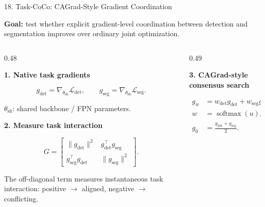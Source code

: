 \documentclass[aspectratio=169,11pt]{beamer}
\begin{document}
\begin{frame}{18. Task-CoCo: CAGrad-Style Gradient Coordination}

\scriptsize
\setlength{\abovedisplayskip}{3pt}
\setlength{\belowdisplayskip}{3pt}
\setlength{\abovedisplayshortskip}{2pt}
\setlength{\belowdisplayshortskip}{2pt}

\textbf{Goal:}
test whether explicit gradient-level coordination between detection and
segmentation improves over ordinary joint optimization.

\vspace{0.08cm}

\begin{columns}[T,onlytextwidth]

\begin{column}{0.48\textwidth}

\textbf{1. Native task gradients}

\[
g_{\mathrm{det}}
=
\nabla_{\theta_{\mathrm{sh}}}
\mathcal{L}_{\mathrm{det}},
\qquad
g_{\mathrm{seg}}
=
\nabla_{\theta_{\mathrm{sh}}}
\mathcal{L}_{\mathrm{seg}}.
\]

{\tiny
$\theta_{\mathrm{sh}}$: shared backbone / FPN parameters.
}

\vspace{0.08cm}

\textbf{2. Measure task interaction}

\[
G=
\begin{bmatrix}
\|g_{\mathrm{det}}\|^2
&
g_{\mathrm{det}}^\top g_{\mathrm{seg}}
\\
g_{\mathrm{seg}}^\top g_{\mathrm{det}}
&
\|g_{\mathrm{seg}}\|^2
\end{bmatrix}.
\]

\vspace{-0.08cm}

{\tiny
The off-diagonal term measures instantaneous task interaction:
positive $\rightarrow$ aligned,
negative $\rightarrow$ conflicting.
}

\end{column}

\begin{column}{0.49\textwidth}

\textbf{3. CAGrad-style consensus search}

\[
\begin{aligned}
g_w
&=
w_{\mathrm{det}}g_{\mathrm{det}}
+
w_{\mathrm{seg}}g_{\mathrm{seg}},
\\
w&=\operatorname{softmax}(u),
\qquad
w_{\mathrm{det}}+w_{\mathrm{seg}}=1,
\\
g_0
&=
\frac{
g_{\mathrm{det}}+g_{\mathrm{seg}}
}{2}.
\end{aligned}
\]


\end{column}
\end{columns}
\end{frame}
\end{document}
